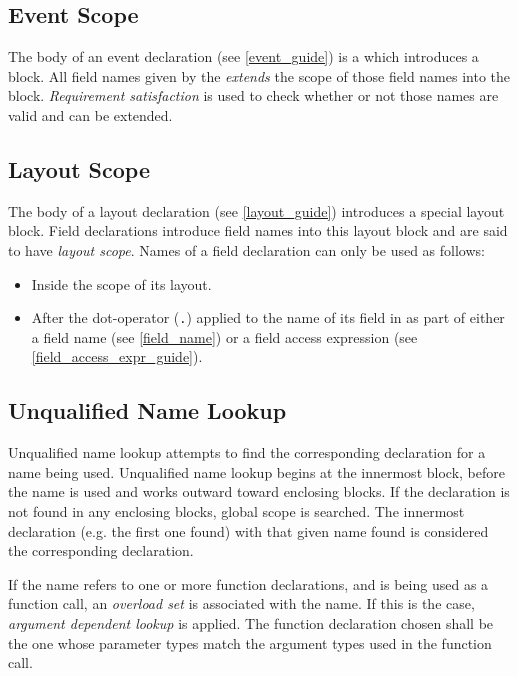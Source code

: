 \subsection{Event Scope} \label{event_scope}

The body of an event declaration (see \ref{event_guide}) is a  which introduces a block. All field names given by the  \textit{extends} the scope of those field names into the block. \textit{Requirement satisfaction} is used to check whether or not those names are valid and can be extended.

\subsection{Layout Scope} \label{layout_scope}

The body of a layout declaration (see \ref{layout_guide}) introduces a special layout block. Field declarations introduce field names into this layout block and are said to have \textit{layout scope}. Names of a field declaration can only be used as follows:

\begin{itemize}
\item Inside the scope of its layout.
\item After the dot-operator (\texttt{.}) applied to the name of its field in as part of either a field name (see \ref{field_name}) or a field access expression (see \ref{field_access_expr_guide}).
\end{itemize}

\subsection{Unqualified Name Lookup} \label{unqlfd_lookup}

Unqualified name lookup attempts to find the corresponding declaration for a name being used. Unqualified name lookup begins at the innermost block, before the name is used and works outward toward enclosing blocks. If the declaration is not found in any enclosing blocks, global scope is searched. The innermost declaration (e.g. the first one found) with that given name found is considered the corresponding declaration. 

If the name refers to one or more function declarations, and is being used as a function call, an \textit{overload set} is associated with the name. If this is the case, \textit{argument dependent lookup} is applied. The function declaration chosen shall be the one whose parameter types match the argument types used in the function call.

